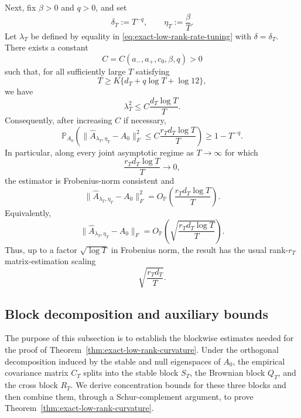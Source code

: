 \documentclass[11pt]{article}
\newtheorem{remark}[theorem]{Remark}
\begin{document}
\noindent
Next, fix $\beta>0$ and $q>0$, and set
\[
\delta_T:=T^{-q},
\qquad
\eta_T:=\frac{\beta}{T}.
\]
Let $\lambda_T$ be defined by equality in \eqref{eq:exact-low-rank-rate-tuning}
with $\delta=\delta_T$. There exists a constant
\[
C=C(a_-,a_+,c_0,\beta,q)>0
\]
such that, for all sufficiently large $T$ satisfying
\[
T\geq K\bigl\{d_T+q\log T+\log 12\bigr\},
\]
we have
\[
\lambda_T^2\leq C\frac{d_T\log T}{T}.
\]
Consequently, after increasing $C$ if necessary,
\[
\mathbb P_{A_0}\!\left(
\bigl\|\widehat A_{\lambda_T,\eta_T}-A_0\bigr\|_F^2
\leq C\frac{r_Td_T\log T}{T}
\right)\geq 1-T^{-q}.
\]
In particular, along every joint asymptotic regime as $T\to\infty$ for which
\[
\frac{r_Td_T\log T}{T}\longrightarrow0,
\]
the estimator is Frobenius-norm consistent and
\[
\bigl\|\widehat A_{\lambda_T,\eta_T}-A_0\bigr\|_F^2
=
O_{\mathbb P}\!\left(\frac{r_Td_T\log T}{T}\right).
\]
Equivalently,
\[
\bigl\|\widehat A_{\lambda_T,\eta_T}-A_0\bigr\|_F
=
O_{\mathbb P}\!\left(
\sqrt{\frac{r_Td_T\log T}{T}}
\right).
\]
Thus, up to a factor $\sqrt{\log T}$ in Frobenius norm, the result has the
usual rank-$r_T$ matrix-estimation scaling
\[
\sqrt{\frac{r_Td_T}{T}}.
\]



\subsection{Block decomposition and auxiliary bounds}

The purpose of this subsection is to establish the blockwise estimates
needed for the proof of Theorem~\ref{thm:exact-low-rank-curvature}. Under the orthogonal decomposition
induced by the stable and null eigenspaces of \(A_0\), the empirical
covariance matrix \(C_T\) splits into the stable block \(S_T\), the
Brownian block \(Q_T\), and the cross block \(R_T\). We derive
concentration bounds for these three blocks and then
combine them, through a Schur-complement argument, to prove Theorem~\ref{thm:exact-low-rank-curvature}.

\label{subsec:exact-low-rank-blocks}
\end{document}
